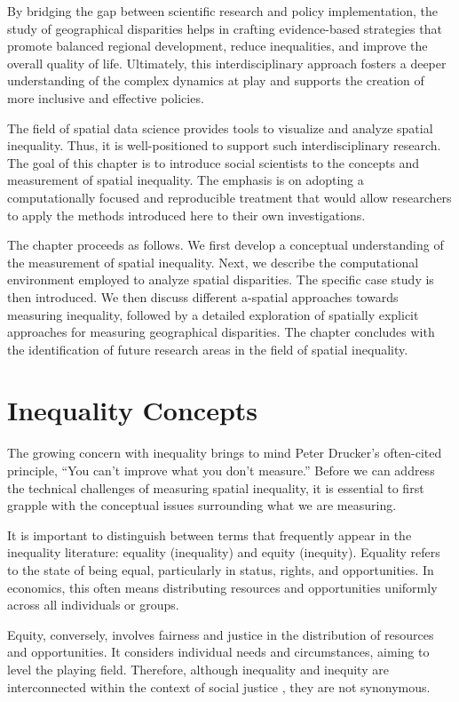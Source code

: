 \documentclass[
  a4paper, 
  twoside,
  final
]{article}
\begin{document}
By bridging the gap between scientific research and policy
implementation, the study of geographical disparities helps in crafting
evidence-based strategies that promote balanced regional development,
reduce inequalities, and improve the overall quality of life.
Ultimately, this interdisciplinary approach fosters a deeper
understanding of the complex dynamics at play and supports the creation
of more inclusive and effective policies.

The field of spatial data science \citep{rey2023GeographicData} provides
tools to visualize and analyze spatial inequality. Thus, it is
well-positioned to support such interdisciplinary research. The goal of
this chapter is to introduce social scientists to the concepts and
measurement of spatial inequality. The emphasis is on adopting a
computationally focused and reproducible treatment that would allow
researchers to apply the methods introduced here to their own
investigations.

The chapter proceeds as follows. We first develop a conceptual
understanding of the measurement of spatial inequality. Next, we
describe the computational environment employed to analyze spatial
disparities. The specific case study is then introduced. We then discuss
different a-spatial approaches towards measuring inequality, followed by
a detailed exploration of spatially explicit approaches for measuring
geographical disparities. The chapter concludes with the identification
of future research areas in the field of spatial inequality.

\section{Inequality Concepts}\label{inequality-concepts}

The growing concern with inequality brings to mind Peter Drucker's
often-cited principle, ``You can't improve what you don't measure.''
Before we can address the technical challenges of measuring spatial
inequality, it is essential to first grapple with the conceptual issues
surrounding what we are measuring.

It is important to distinguish between terms that frequently appear in
the inequality literature: equality (inequality) and equity (inequity).
Equality refers to the state of being equal, particularly in status,
rights, and opportunities. In economics, this often means distributing
resources and opportunities uniformly across all individuals or groups.

Equity, conversely, involves fairness and justice in the distribution of
resources and opportunities. It considers individual needs and
circumstances, aiming to level the playing field. Therefore, although
inequality and inequity are interconnected within the context of social
justice \citep{sen2004InequalityReexamined}, they are not synonymous.
\end{document}
